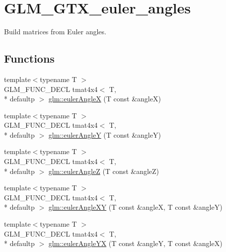 \hypertarget{group__gtx__euler__angles}{\section{G\-L\-M\-\_\-\-G\-T\-X\-\_\-euler\-\_\-angles}
\label{group__gtx__euler__angles}
}


Build matrices from Euler angles.  


\subsection*{Functions}
\begin{DoxyCompactItemize}
\item 
{\footnotesize template$<$typename T $>$ }\\G\-L\-M\-\_\-\-F\-U\-N\-C\-\_\-\-D\-E\-C\-L tmat4x4$<$ T, \\*
defaultp $>$ \hyperlink{group__gtx__euler__angles_ga82cd3b8a04943f1a0d1a562aff358dc8}{glm\-::euler\-Angle\-X} (T const \&angle\-X)
\item 
{\footnotesize template$<$typename T $>$ }\\G\-L\-M\-\_\-\-F\-U\-N\-C\-\_\-\-D\-E\-C\-L tmat4x4$<$ T, \\*
defaultp $>$ \hyperlink{group__gtx__euler__angles_gaeb193af1184bdf39c23636d756e1ff33}{glm\-::euler\-Angle\-Y} (T const \&angle\-Y)
\item 
{\footnotesize template$<$typename T $>$ }\\G\-L\-M\-\_\-\-F\-U\-N\-C\-\_\-\-D\-E\-C\-L tmat4x4$<$ T, \\*
defaultp $>$ \hyperlink{group__gtx__euler__angles_gab59c4fe7f735568255cc19fddd3ddfcd}{glm\-::euler\-Angle\-Z} (T const \&angle\-Z)
\item 
{\footnotesize template$<$typename T $>$ }\\G\-L\-M\-\_\-\-F\-U\-N\-C\-\_\-\-D\-E\-C\-L tmat4x4$<$ T, \\*
defaultp $>$ \hyperlink{group__gtx__euler__angles_ga8bf84f92ca976a7f50dbe4b30ceb72dd}{glm\-::euler\-Angle\-X\-Y} (T const \&angle\-X, T const \&angle\-Y)
\item 
{\footnotesize template$<$typename T $>$ }\\G\-L\-M\-\_\-\-F\-U\-N\-C\-\_\-\-D\-E\-C\-L tmat4x4$<$ T, \\*
defaultp $>$ \hyperlink{group__gtx__euler__angles_gafdd02f9a37511190962119adef5c1c25}{glm\-::euler\-Angle\-Y\-X} (T const \&angle\-Y, T const \&angle\-X)

\end{DoxyCompactItemize}
